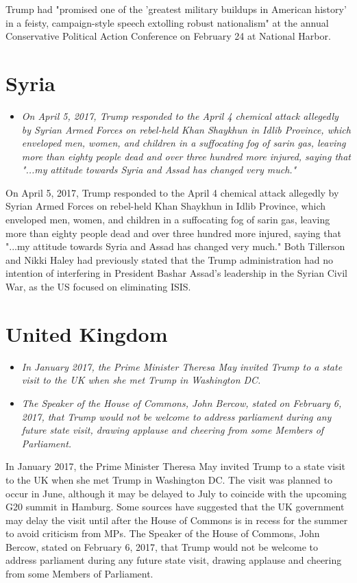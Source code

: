 Trump had "promised one of the 'greatest military buildups in American
history' in a feisty, campaign-style speech extolling robust
nationalism" at the annual Conservative Political Action Conference on
February 24 at National Harbor.

\section{Syria}\label{syria}

\begin{itemize}
\item
  \emph{On April 5, 2017, Trump responded to the April 4 chemical attack
  allegedly by Syrian Armed Forces on rebel-held Khan Shaykhun in Idlib
  Province, which enveloped men, women, and children in a suffocating
  fog of sarin gas, leaving more than eighty people dead and over three
  hundred more injured, saying that "...my attitude towards Syria and
  Assad has changed very much."}
\end{itemize}

On April 5, 2017, Trump responded to the April 4 chemical attack
allegedly by Syrian Armed Forces on rebel-held Khan Shaykhun in Idlib
Province, which enveloped men, women, and children in a suffocating fog
of sarin gas, leaving more than eighty people dead and over three
hundred more injured, saying that "...my attitude towards Syria and
Assad has changed very much." Both Tillerson and Nikki Haley had
previously stated that the Trump administration had no intention of
interfering in President Bashar Assad's leadership in the Syrian Civil
War, as the US focused on eliminating ISIS.

\section{United Kingdom}\label{united-kingdom}

\begin{itemize}
\item
  \emph{In January 2017, the Prime Minister Theresa May invited Trump to
  a state visit to the UK when she met Trump in Washington DC.}
\item
  \emph{The Speaker of the House of Commons, John Bercow, stated on
  February 6, 2017, that Trump would not be welcome to address
  parliament during any future state visit, drawing applause and
  cheering from some Members of Parliament.}
\end{itemize}

In January 2017, the Prime Minister Theresa May invited Trump to a state
visit to the UK when she met Trump in Washington DC. The visit was
planned to occur in June, although it may be delayed to July to coincide
with the upcoming G20 summit in Hamburg. Some sources have suggested
that the UK government may delay the visit until after the House of
Commons is in recess for the summer to avoid criticism from MPs. The
Speaker of the House of Commons, John Bercow, stated on February 6,
2017, that Trump would not be welcome to address parliament during any
future state visit, drawing applause and cheering from some Members of
Parliament.

